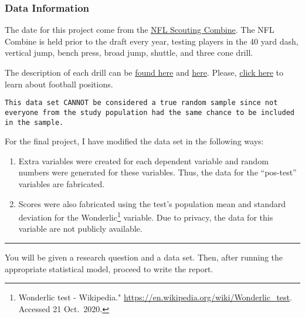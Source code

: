 \documentclass[11pt,]{article}
\begin{document}
\hypertarget{data-information}{%
\subsubsection{Data Information}\label{data-information}}

The date for this project come from the
\href{https://en.wikipedia.org/wiki/NFL_Scouting_Combine}{NFL Scouting
Combine}. The NFL Combine is held prior to the draft every year, testing
players in the 40 yard dash, vertical jump, bench press, broad jump,
shuttle, and three cone drill.

The description of each drill can be
\href{https://nflcombineresults.com/nfl-combine-drills-101-what-each-drill-measures/}{found
here} and
\href{https://www.espn.com/nfl/draft2018/story/_/id/22587931/guide-nfl-draft-combine-drills-todd-mcshay-numbers-know-40-yard-dash-short-shuttle-bench-press}{here}.
Please,
\href{https://protips.dickssportinggoods.com/sports-and-activities/football/football-101-football-positions-and-their-roles}{click
here} to learn about football positions.

\begin{verbatim}
This data set CANNOT be considered a true random sample since not everyone from the study population had the same chance to be included in the sample.
\end{verbatim}

For the final project, I have modified the data set in the following
ways:

\begin{enumerate}
\def\labelenumi{\arabic{enumi}.}
\item
  Extra variables were created for each dependent variable and random
  numbers were generated for these variables. Thus, the data for the
  ``pos-test'' variables are fabricated.
\item
  Scores were also fabricated using the test's population mean and
  standard deviation for the Wonderlic\footnote{Wonderlic test -
    Wikipedia." \url{https://en.wikipedia.org/wiki/Wonderlic_test}.
    Accessed 21 Oct.~2020.} variable. Due to privacy, the data for this
  variable are not publicly available.
\end{enumerate}

\begin{center}\rule{0.5\linewidth}{0.5pt}\end{center}

You will be given a research question and a data set. Then, after
running the appropriate statistical model, proceed to write the report.
\end{document}
